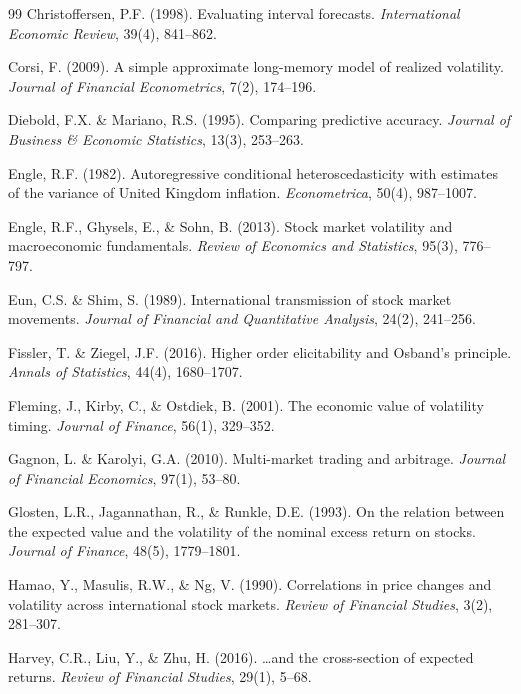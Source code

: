\documentclass[12pt,a4paper]{article}
\begin{document}
\begin{thebibliography}{99}
Christoffersen, P.F. (1998). Evaluating interval forecasts. \textit{International Economic Review}, 39(4), 841--862.

Corsi, F. (2009). A simple approximate long-memory model of realized volatility. \textit{Journal of Financial Econometrics}, 7(2), 174--196.

Diebold, F.X. \& Mariano, R.S. (1995). Comparing predictive accuracy. \textit{Journal of Business \& Economic Statistics}, 13(3), 253--263.

Engle, R.F. (1982). Autoregressive conditional heteroscedasticity with estimates of the variance of United Kingdom inflation. \textit{Econometrica}, 50(4), 987--1007.

Engle, R.F., Ghysels, E., \& Sohn, B. (2013). Stock market volatility and macroeconomic fundamentals. \textit{Review of Economics and Statistics}, 95(3), 776--797.

Eun, C.S. \& Shim, S. (1989). International transmission of stock market movements. \textit{Journal of Financial and Quantitative Analysis}, 24(2), 241--256.

Fissler, T. \& Ziegel, J.F. (2016). Higher order elicitability and Osband's principle. \textit{Annals of Statistics}, 44(4), 1680--1707.

Fleming, J., Kirby, C., \& Ostdiek, B. (2001). The economic value of volatility timing. \textit{Journal of Finance}, 56(1), 329--352.

Gagnon, L. \& Karolyi, G.A. (2010). Multi-market trading and arbitrage. \textit{Journal of Financial Economics}, 97(1), 53--80.

Glosten, L.R., Jagannathan, R., \& Runkle, D.E. (1993). On the relation between the expected value and the volatility of the nominal excess return on stocks. \textit{Journal of Finance}, 48(5), 1779--1801.

Hamao, Y., Masulis, R.W., \& Ng, V. (1990). Correlations in price changes and volatility across international stock markets. \textit{Review of Financial Studies}, 3(2), 281--307.

Harvey, C.R., Liu, Y., \& Zhu, H. (2016). \ldots and the cross-section of expected returns. \textit{Review of Financial Studies}, 29(1), 5--68.


\end{thebibliography}
\end{document}

